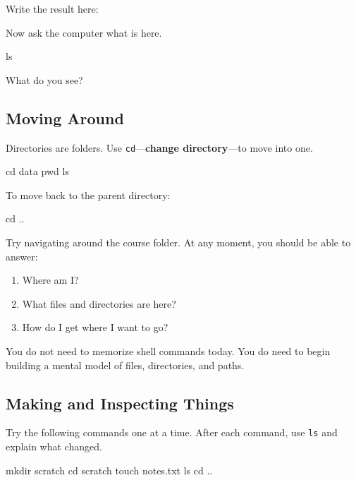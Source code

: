 \documentclass[11pt]{article}
\begin{document}
Write the result here:

\vspace{0.4in}

Now ask the computer what is here.

\begin{terminal}
ls
\end{terminal}

What do you see?

\vspace{0.4in}

\subsection{Moving Around}

Directories are folders. Use \texttt{cd}---\textbf{change directory}---to
move into one.

\begin{terminal}
cd data
pwd
ls
\end{terminal}

To move back to the parent directory:

\begin{terminal}
cd ..
\end{terminal}

Try navigating around the course folder. At any moment, you should be able to
answer:

\begin{enumerate}[leftmargin=*]
  \item Where am I?
  \item What files and directories are here?
  \item How do I get where I want to go?
\end{enumerate}

\begin{keyidea}
You do not need to memorize shell commands today. You do need to begin
building a mental model of files, directories, and paths.
\end{keyidea}

\subsection{Making and Inspecting Things}

Try the following commands one at a time. After each command, use
\texttt{ls} and explain what changed.

\begin{terminal}
mkdir scratch
cd scratch
touch notes.txt
ls
cd ..
\end{terminal}
\end{document}

